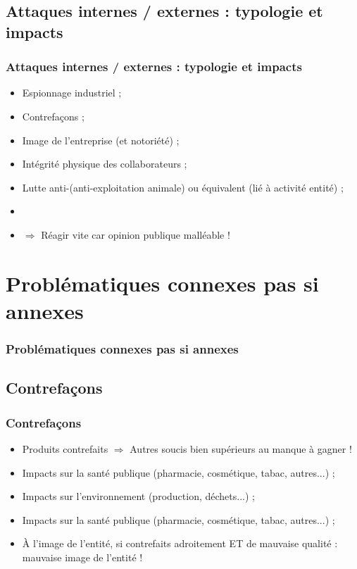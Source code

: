 \documentclass[slidetop,11pt]{beamer}
\begin{document}
\subsection{Attaques internes / externes : typologie et impacts}
\begin{frame}
	\frametitle{Attaques internes / externes : typologie et impacts}
	\begin{itemize}
		\item Espionnage industriel ; 
		\item Contrefa\c{c}ons ; 
		\item Image de l'entreprise (et notori{\'e}t{\'e}) ;
		\item Int{\'e}grit{\'e} physique des collaborateurs ; 
		\item Lutte anti-(anti-exploitation animale) ou {\'e}quivalent (li{\'e} {\`a} activit{\'e} entit{\'e}) ; 
		\item[] 
		\item $\Rightarrow$ R{\'e}agir vite car opinion publique mall{\'e}able !
	\end{itemize}
\end{frame}

\section{Probl{\'e}matiques connexes pas si annexes }
\begin{frame}
	\frametitle{Probl{\'e}matiques connexes pas si annexes }
	\tableofcontents[sections=2,currentsection,subsectionstyle=show/shaded/hide] %
\end{frame}

\subsection{Contrefa\c{c}ons}
\begin{frame}
	\frametitle{Contrefa\c{c}ons}
	\begin{itemize}
		\item Produits contrefaits $\Rightarrow$ Autres soucis bien sup{\'e}rieurs au manque {\`a} gagner !
		\item Impacts sur la sant{\'e} publique (pharmacie, cosm{\'e}tique, tabac, autres...) ; 
		\item Impacts sur l'environnement (production, d{\'e}chets...) ; 
		\item Impacts sur la sant{\'e} publique (pharmacie, cosm{\'e}tique, tabac, autres...) ; 
		\item {\`A} l'image de l'entit{\'e}, si contrefaits adroitement ET de mauvaise qualit{\'e} : mauvaise image de l'entit{\'e} !
	\end{itemize}
\end{frame}
\end{document}
